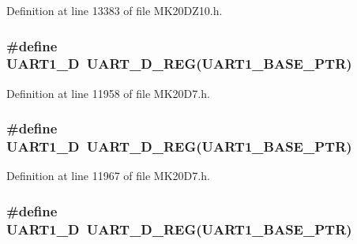 Definition at line 13383 of file M\+K20\+D\+Z10.\+h.

\subsubsection[{\texorpdfstring{U\+A\+R\+T1\+\_\+D}{UART1_D}}]{\setlength{\rightskip}{0pt plus 5cm}\#define U\+A\+R\+T1\+\_\+D~{\bf U\+A\+R\+T\+\_\+\+D\+\_\+\+R\+EG}({\bf U\+A\+R\+T1\+\_\+\+B\+A\+S\+E\+\_\+\+P\+TR})}\hypertarget{group___u_a_r_t___register___accessor___macros_gaf408be28f737716d8e617f2b5c26e6c3}{}\label{group___u_a_r_t___register___accessor___macros_gaf408be28f737716d8e617f2b5c26e6c3}


Definition at line 11958 of file M\+K20\+D7.\+h.

\subsubsection[{\texorpdfstring{U\+A\+R\+T1\+\_\+D}{UART1_D}}]{\setlength{\rightskip}{0pt plus 5cm}\#define U\+A\+R\+T1\+\_\+D~{\bf U\+A\+R\+T\+\_\+\+D\+\_\+\+R\+EG}({\bf U\+A\+R\+T1\+\_\+\+B\+A\+S\+E\+\_\+\+P\+TR})}\hypertarget{group___u_a_r_t___register___accessor___macros_gaf408be28f737716d8e617f2b5c26e6c3}{}\label{group___u_a_r_t___register___accessor___macros_gaf408be28f737716d8e617f2b5c26e6c3}


Definition at line 11967 of file M\+K20\+D7.\+h.

\subsubsection[{\texorpdfstring{U\+A\+R\+T1\+\_\+D}{UART1_D}}]{\setlength{\rightskip}{0pt plus 5cm}\#define U\+A\+R\+T1\+\_\+D~{\bf U\+A\+R\+T\+\_\+\+D\+\_\+\+R\+EG}({\bf U\+A\+R\+T1\+\_\+\+B\+A\+S\+E\+\_\+\+P\+TR})}\hypertarget{group___u_a_r_t___register___accessor___macros_gaf408be28f737716d8e617f2b5c26e6c3}{}\label{group___u_a_r_t___register___accessor___macros_gaf408be28f737716d8e617f2b5c26e6c3}


